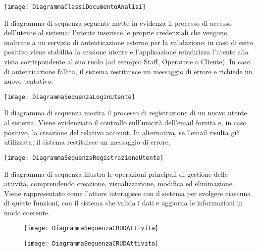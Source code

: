 \documentclass[a4paper]{report}
\begin{document}
\begin{figure*}[!ht]
    \centering
    \texttt{[image: DiagrammaClassiDocumentoAnalisi]}
\end{figure*}

\clearpage
{}

\noindent
Il diagramma di sequenza seguente mette in evidenza il processo di accesso dell'utente al sistema: l'utente inserisce le proprie credenziali che vengono inoltrate a un servizio di autenticazione esterno per la validazione; in caso di esito positivo viene stabilita la sessione utente e l'applicazione reindirizza l'utente alla vista corrispondente al suo ruolo (ad esempio Staff, Operatore o Cliente). In caso di autenticazione fallita, il sistema restituisce un messaggio di errore e richiede un nuovo tentativo.

\begin{figure*}[!ht]
    \centering
    \texttt{[image: DiagrammaSequenzaLoginUtente]}
\end{figure*}

\clearpage
{}
\noindent
Il diagramma di sequenza mostra il processo di registrazione di un nuovo utente al sistema. Viene evidenziato il controllo sull’unicità dell’email fornita e, in caso positivo, la creazione del relativo account. In alternativa, se l’email risulta già utilizzata, il sistema restituisce un messaggio di errore.

\begin{figure*}[!ht]
    \centering
    \texttt{[image: DiagrammaSequenzaRegistrazioneUtente]}
\end{figure*}

\clearpage
{}
\noindent
Il diagramma di sequenza illustra le operazioni principali di gestione delle attività, comprendendo creazione, visualizzazione, modifica ed eliminazione. Viene rappresentato come l’attore interagisce con il sistema per svolgere ciascuna di queste funzioni, con il sistema che valida i dati e aggiorna le informazioni in modo coerente.

\begin{figure}[!ht]
  \centering
  \texttt{[image: DiagrammaSequenzaCRUDAttivita]}
\end{figure}
\clearpage
\begin{figure}[!ht]
  \centering
  \texttt{[image: DiagrammaSequenzaCRUDAttivita]}
\end{figure}
\end{document}
